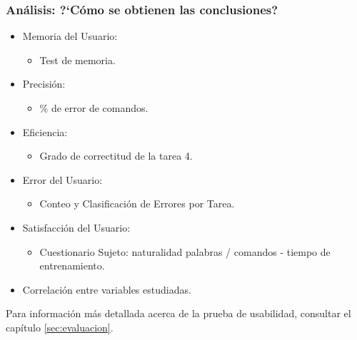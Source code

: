 \subsubsection{An\'alisis: {?`}C\'omo se obtienen las conclusiones?}
\begin{itemize}
    \item Memoria del Usuario:
    \begin{itemize}
        \item Test de memoria.
    \end{itemize}
    \item Precisi\'on:
    \begin{itemize}
        \item \% de error de comandos.
    \end{itemize}
    \item Eficiencia:
    \begin{itemize}
        \item Grado de correctitud de la tarea 4.
    \end{itemize}
    \item Error del Usuario:
    \begin{itemize}
        \item Conteo y Clasificaci\'on de Errores por Tarea.
    \end{itemize}
    \item Satisfacci\'on del Usuario:
    \begin{itemize}
        \item Cuestionario Sujeto: naturalidad palabras / comandos - tiempo de entrenamiento.   
    \end{itemize}
    \item Correlaci\'on entre variables estudiadas.
\end{itemize}

Para información más detallada acerca de la prueba de usabilidad, consultar el capítulo 
\ref{sec:evaluacion}.